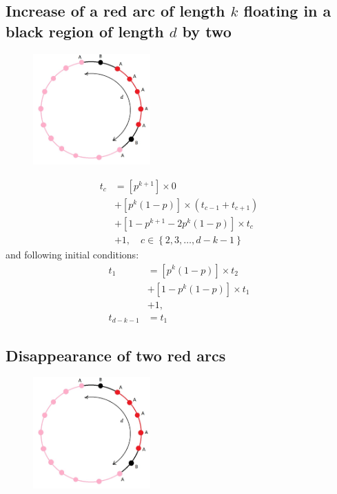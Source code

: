 \documentclass[]{book}
\theoremstyle{definition}
\begin{document}
\subsection{Increase of a red arc of length $k$ floating in a black region of length $d$ by two}
\begin{figure}[H]
    \centering\includegraphics[width=0.4\textwidth]{figures/arc increase.jpg}
    \caption{}
\end{figure}

\begin{equation}
\begin{split}
    t_c &= \left[p^{k+1} \right] \times 0 \\
    &+ \left[ p^k\left( 1-p \right) \right] \times \left( t_{c-1} + t_{c+1} \right) \\
    &+ \left[1 - p^{k+1} - 2p^k\left( 1-p \right) \right] \times t_c \\
    &+ 1, \quad c \in \left\{ 2, 3, \hdots, d - k - 1 \right\}
\end{split}
\end{equation}
and following initial conditions:
\begin{equation}
\begin{split}
    t_1 &= \left[p^k\left( 1-p \right) \right] \times t_2 \\
    &+ \left[ 1 - p^k\left( 1-p \right) \right] \times t_1 \\
    &+ 1, \\
    t_{d-k-1} &= t_1
\end{split}
\end{equation}

\subsection{Disappearance of two red arcs}
\begin{figure}[H]
    \centering\includegraphics[width=0.4\textwidth]{figures/arc increase.jpg}
    \caption{}
\end{figure}
\end{document}
